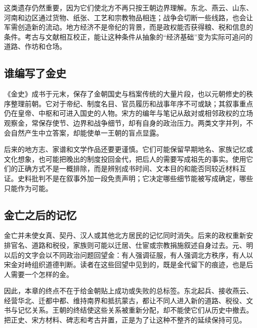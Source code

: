 这类遗存仍然重要，因为它们使北方不再只按王朝边界理解。东北、燕云、山东、河南和边区通过货物、纸张、工艺和宗教物品相连；战争会切断一些线路，也会让军需创造新的流动。地方经济不是帝纪的背景，而是政权能否获得粮、税和信息的条件。考古与文献相互校正，能让这种条件从抽象的“经济基础”变为实际可追问的道路、作坊和仓场。

\subsection{谁编写了金史}

《金史》成书于元末，保存了金朝国史与档案传统的大量片段，也以元朝修史的秩序整理前朝。它对于帝纪、制度名目、官员履历和战事年序不可或缺；其叙事重点仍在皇帝、中枢和可进入国史的人物。宋方的编年与笔记从敌对或相邻政权的立场观察金，常保存使节、边界和战争细节，却有自身的政治压力。两类文字并列，不会自然产生中立答案，却能使单一王朝的盲点显露。

后来的地方志、家谱和文学作品还要更谨慎。它们可能保留早期地名、家族记忆或文化想象，也可能把晚出的制度投回金代，把后人的需要写成祖先的事实。使用它们的正确方式不是一概排除，而是辨别成书时间、文本目的和能否同较近材料互证。史料批判不是在叙事外加一段免责声明；它决定哪些细节能被写成确定，哪些只能作为可能。

\subsection{金亡之后的记忆}

金亡并未使女真、契丹、汉人或其他北方居民的记忆同时消失。后来的政权重新安排官名、道路和税役，家族则可能以迁居、仕宦或宗教捐施叙述自身过去。元、明以后的文字会以不同政治问题回望金：有人强调征服，有人强调北方秩序，有人以宋金对峙组织道德判断。读者在这些回望中见到的，既是金代留下的痕迹，也是后人需要一个怎样的金。

因此，本章的终点不在于给金朝贴上成功或失败的总标签。东北起兵、接收燕云、经营华北、迁都中都、维持南界和抵抗蒙古，都让不同人进入新的道路、税役、文书与记忆关系。王朝的终结使这些关系被重新分配，却不能使它们从历史中撤去。把正史、宋方材料、碑志和考古并置，正是为了让这种不整齐的延续保持可见。
